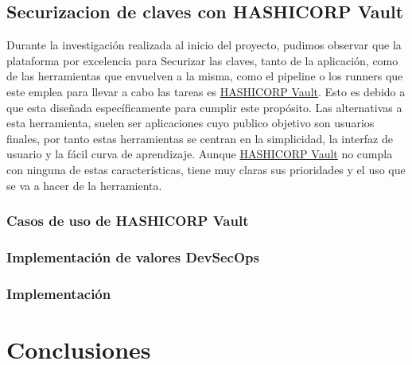\documentclass[12pt]{report} %
\begin{document}
\section{Securizacion de claves con HASHICORP Vault}

Durante la investigación realizada al inicio del proyecto, pudimos observar que
la plataforma por excelencia para Securizar las claves, tanto de la aplicación,
como de las herramientas que envuelven a la misma, como el \gls{pipeline} o los
\gls{runner}s que este emplea para llevar a cabo las tareas es 
\href{https://www.hashicorp.com/products/vault}{HASHICORP Vault}.
Esto es debido a que esta diseñada específicamente para cumplir este propósito.
Las alternativas a esta herramienta, suelen ser aplicaciones cuyo publico
objetivo son usuarios finales, por tanto estas herramientas se centran en la
simplicidad, la interfaz de usuario y la fácil curva de aprendizaje.
Aunque \href{https://www.hashicorp.com/products/vault}{HASHICORP Vault} no
cumpla con ninguna de estas características, tiene muy claras sus prioridades y
el uso que se va a hacer de la herramienta.

\subsection{Casos de uso de HASHICORP Vault}

\subsection{Implementación de valores DevSecOps}

\subsection{Implementación}




\chapter{Conclusiones}
\end{document}
